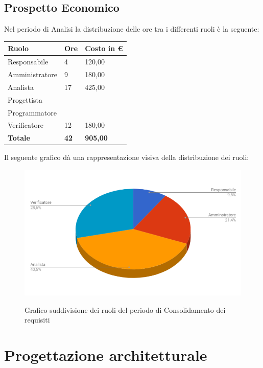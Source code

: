 \documentclass[PianoDiProgetto.tex]{subfiles}
\begin{document}
\subsection{Prospetto Economico}
Nel periodo di Analisi la distribuzione delle ore tra i differenti ruoli è la seguente:
\begin{center}
\begin{table}[htbp]
	\centering
	\renewcommand\arraystretch{1.5}
	\begin{tabularx}{\textwidth}{p{5cm}|p{4cm}|p{4cm}}
		\hline
		\textbf{Ruolo} & \textbf{Ore} & \textbf{Costo in \euro} \\
		\hline
		Responsabile & 4 & 120,00 \\
		\hline
		Amministratore & 9 & 180,00 \\
		\hline
		Analista & 17 & 425,00 \\
		\hline
		Progettista & \ & \ \\
		\hline
		Programmatore & \ & \ \\
		\hline
		Verificatore & 12 & 180,00 \\
		\hline
		\textbf{Totale} & \textbf{42} & \textbf{905,00}\\
		\hline
	\end{tabularx}
\end{table} 
\end{center}
Il seguente grafico dà una rappresentazione visiva della distribuzione dei ruoli:
\begin{figure}[h]
	\centering
	\includegraphics[width=12.5cm]{images/prospettoEconomico/consolidamento.png}
	\label{fig:foo}
	\caption{Grafico suddivisione dei ruoli del periodo di Consolidamento dei requisiti}
\end{figure} 
\clearpage
\section{Progettazione architetturale}
\end{document}
